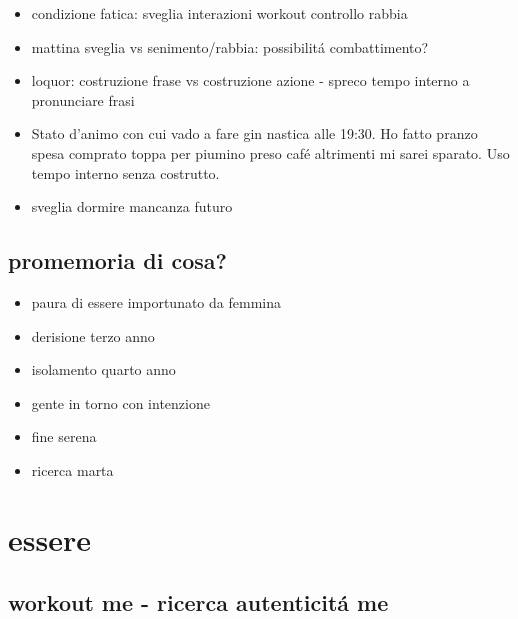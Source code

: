 \begin{itemize}
\item condizione fatica: sveglia interazioni workout controllo rabbia
\item mattina sveglia vs senimento/rabbia: possibilit\'a combattimento?
\item loquor:
costruzione frase vs costruzione azione - spreco tempo interno a pronunciare frasi
\item Stato d'animo con cui vado a fare gin nastica alle 19:30. Ho fatto pranzo spesa comprato toppa per piumino preso caf\'e altrimenti mi sarei sparato. Uso tempo interno senza costrutto.
\item sveglia dormire mancanza futuro
\end{itemize}

\subsection{promemoria di cosa?}

\begin{itemize}
\item paura di essere importunato da femmina
\item derisione terzo anno
\item isolamento quarto anno
\item gente in  torno con intenzione
\item fine serena
\item ricerca marta
\end{itemize}

\section{essere}

\subsection{workout me - ricerca autenticit\'a me}

